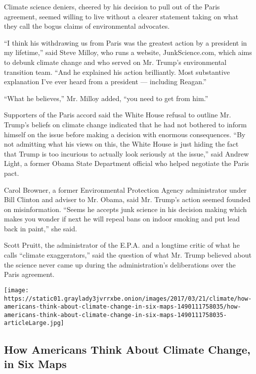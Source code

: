 Climate science deniers, cheered by his decision to pull out of the
Paris agreement, seemed willing to live without a clearer statement
taking on what they call the bogus claims of environmental advocates.

``I think his withdrawing us from Paris was the greatest action by a
president in my lifetime,'' said Steve Milloy, who runs a website,
JunkScience.com, which aims to debunk climate change and who served on
Mr. Trump's environmental transition team. ``And he explained his action
brilliantly. Most substantive explanation I've ever heard from a
president --- including Reagan.''

``What he believes,'' Mr. Milloy added, ``you need to get from him.''

Supporters of the Paris accord said the White House refusal to outline
Mr. Trump's beliefs on climate change indicated that he had not bothered
to inform himself on the issue before making a decision with enormous
consequences. ``By not admitting what his views on this, the White House
is just hiding the fact that Trump is too incurious to actually look
seriously at the issue,'' said Andrew Light, a former Obama State
Department official who helped negotiate the Paris pact.

Carol Browner, a former Environmental Protection Agency administrator
under Bill Clinton and adviser to Mr. Obama, said Mr. Trump's action
seemed founded on misinformation. ``Seems he accepts junk science in his
decision making which makes you wonder if next he will repeal bans on
indoor smoking and put lead back in paint,'' she said.

Scott Pruitt, the administrator of the E.P.A. and a longtime critic of
what he calls ``climate exaggerators,'' said the question of what Mr.
Trump believed about the science never came up during the
administration's deliberations over the Paris agreement.

\href{https://www.nytimes3xbfgragh.onion/interactive/2017/03/21/climate/how-americans-think-about-climate-change-in-six-maps.html}{}

\texttt{[image: https://static01.graylady3jvrrxbe.onion/images/2017/03/21/climate/how-americans-think-about-climate-change-in-six-maps-1490111758035/how-americans-think-about-climate-change-in-six-maps-1490111758035-articleLarge.jpg]}

\hypertarget{how-americans-think-about-climate-change-in-six-maps}{%
\subsection{How Americans Think About Climate Change, in Six
Maps}\label{how-americans-think-about-climate-change-in-six-maps}}

